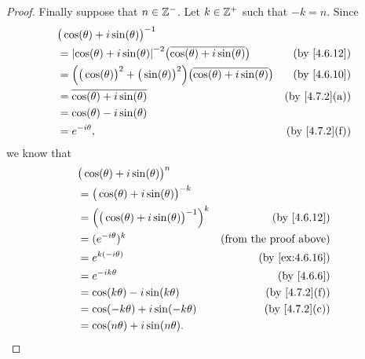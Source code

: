 \begin{proof}
  Finally suppose that \(n \in \mathbb{Z}^-\).
  Let \(k \in \mathbb{Z}^+\) such that \(-k = n\).
  Since
  \begin{align*}
     & \big(\cos(\theta) + i \sin(\theta)\big)^{-1}                                                                                                     \\
     & = \abs{\cos(\theta) + i \sin(\theta)}^{-2} \big(\overline{\cos(\theta) + i \sin(\theta)}\big)                      & \text{(by \cref{4.6.12})}   \\
     & = \Big(\big(\cos(\theta)\big)^2 + \big(\sin(\theta)\big)^2\Big) \big(\overline{\cos(\theta) + i \sin(\theta)}\big) & \text{(by \cref{4.6.10})}   \\
     & = \overline{\cos(\theta) + i \sin(\theta)}                                                                         & \text{(by \cref{4.7.2}(a))} \\
     & = \cos(\theta) - i \sin(\theta)                                                                                                                  \\
     & = e^{- i \theta},                                                                                                  & \text{(by \cref{4.7.2}(f))}
  \end{align*}
  we know that
  \begin{align*}
     & \big(\cos(\theta) + i \sin(\theta)\big)^n                                                  \\
     & = \big(\cos(\theta) + i \sin(\theta)\big)^{-k}                                             \\
     & = \Big(\big(\cos(\theta) + i \sin(\theta)\big)^{-1}\Big)^k & \text{(by \cref{4.6.12})}     \\
     & = (e^{- i \theta})^k                                       & \text{(from the proof above)} \\
     & = e^{k (- i \theta)}                                       & \text{(by \cref{ex:4.6.16})}  \\
     & = e^{- i k \theta}                                         & \text{(by \cref{4.6.6})}      \\
     & = \cos(k \theta) - i \sin(k \theta)                        & \text{(by \cref{4.7.2}(f))}   \\
     & = \cos(- k \theta) + i \sin(- k \theta)                    & \text{(by \cref{4.7.2}(c))}   \\
     & = \cos(n \theta) + i \sin(n \theta).
  \end{align*}

\end{proof}
